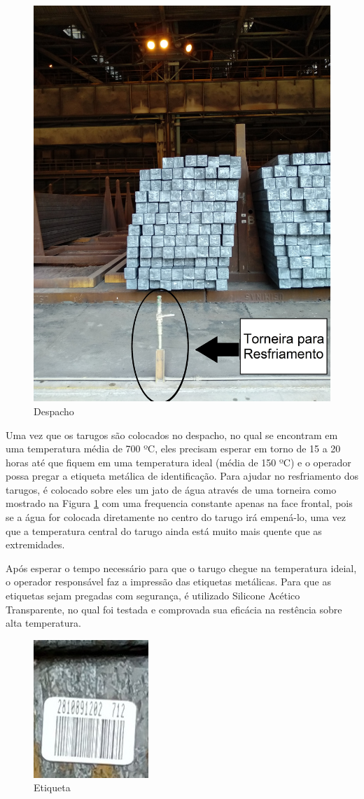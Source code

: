 \begin{figure}[htbp]
	\centering
	\includegraphics[width=0.5\linewidth]{figuras/Steel/despacho.jpg}
	\caption{Despacho}
	\label{fig:despacho}
\end{figure}

Uma vez que os tarugos são colocados no despacho, no qual se encontram em uma temperatura média de 700 ºC, eles precisam esperar em torno de 15 a 20 horas até que fiquem em uma temperatura ideal (média de 150 ºC) e o operador possa pregar a etiqueta metálica de identificação. Para ajudar no resfriamento dos tarugos, é colocado sobre eles um jato de água através de uma torneira como mostrado na Figura \ref{fig:despacho} com uma frequencia constante apenas na face frontal, pois se a água for colocada diretamente no centro do tarugo irá empená-lo, uma vez que a temperatura central do tarugo ainda está muito mais quente que as extremidades.

Após esperar o tempo necessário para que o tarugo chegue na temperatura ideial, o operador responsável faz a impressão das etiquetas metálicas. Para que as etiquetas sejam pregadas com segurança, é utilizado Silicone Acético Transparente, no qual foi testada e comprovada sua eficácia na restência sobre alta temperatura. 

\begin{figure}[htbp]
	\centering
	\includegraphics[width=0.25\linewidth]{figuras/Steel/barcode.jpg}
	\caption{Etiqueta}
	\label{fig:barcode}
\end{figure}

